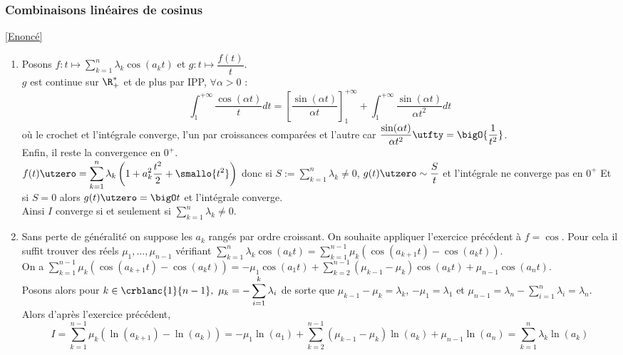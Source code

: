 \documentclass{book}
\begin{document}
	\subsubsection{Combinaisons linéaires de cosinus }
	\label{Combinaisons linéaires de cosinus corrigé}
	\textcolor{blue}{\hyperref[Combinaisons linéaires de cosinus]{[Enoncé]}}\\
	\begin{enumerate}
		\item Posons $f:t\mapsto \displaystyle\sum_{k=1}^n\lambda_k\cos(a_kt)$ et $g:t\mapsto \dfrac{f(t)}{t}$.\\
		$g$ est continue sur $\R^*_+$ et de plus par IPP, $\forall \alpha>0$ :
		$$\int_1^{+\infty}\frac{\cos(\alpha t)}{t}dt=\left[\frac{\sin(\alpha t)}{\alpha t}\right]_1^{+\infty}+\int_1^{+\infty}\frac{\sin(\alpha t)}{\alpha t^2}dt$$
		où le crochet et l'intégrale converge, l'un par croissances comparées et l'autre car $\dfrac{\sin(\alpha t)}{\alpha t^2}\utfty=\bigO{\dfrac{1}{t^2}}$.\\
		Enfin, il reste la convergence en $0^+$.\\
		$f(t)\utzero=\displaystyle\sum_{k=1}^n\lambda_k\left(1+a_k^2\frac{t^2}{2}+\smallo{t^2}\right)$ donc si $S:=\displaystyle\sum_{k=1}^n\lambda_k\ne 0$, $g(t)\utzero\sim\dfrac{S}{t}$ et l'intégrale ne converge pas en $0^+$ Et si $S=0$ alors $g(t)\utzero=\bigO t$ et l'intégrale converge.\\
		Ainsi $I$ converge si et seulement si $\displaystyle\sum_{k=1}^n\lambda_k\ne 0$.
		\item Sans perte de généralité on suppose les $a_k$ rangés par ordre croissant.
		On souhaite appliquer l'exercice précédent à $f=\cos$. Pour cela il suffit trouver des réels $\mu_1,\dots,\mu_{n-1}$ vérifiant $\displaystyle\sum_{k=1}^n\lambda_k\cos(a_kt)=\sum_{k=1}^{n-1}\mu_k(\cos(a_{k+1}t)-\cos(a_kt))$.\\
		On a $\displaystyle\sum_{k=1}^{n-1}\mu_k(\cos(a_{k+1}t)-\cos(a_kt))=-\mu_1\cos(a_1t)+\sum_{k=2}^{n-1}(\mu_{k-1}-\mu_k)\cos(a_kt)+\mu_{n-1}\cos(a_nt)$.\\
		Posons alors pour $k\in \crblanc{1}{n-1},\ \mu_k=-\displaystyle\sum_{i=1}^k\lambda_i$ de sorte que $\mu_{k-1}-\mu_k=\lambda_k$, $-\mu_1=\lambda_1$ et $\mu_{n-1}=\lambda_n-\displaystyle\sum_{i=1}^n\lambda_i=\lambda_n$.\\
		Alors d'après l'exercice précédent,
		$$I=\sum_{k=1}^{n-1}\mu_k(\ln(a_{k+1})-\ln(a_k))=-\mu_1\ln(a_1)+\sum_{k=2}^{n-1}(\mu_{k-1}-\mu_k)\ln(a_k)+\mu_{n-1}\ln(a_n)=\sum_{k=1}^n\lambda_k\ln(a_k)$$
	\end{enumerate}
	
\end{document}
